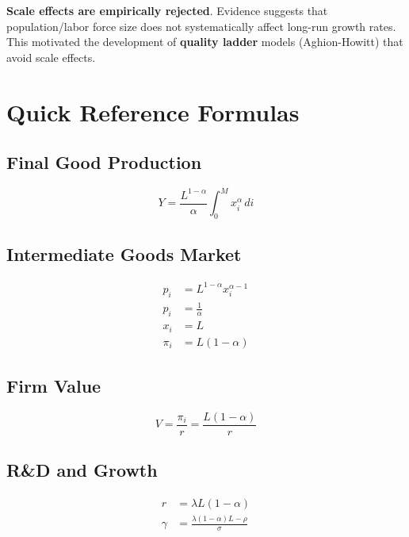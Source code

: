 \documentclass[a4paper,11pt]{article}
\begin{document}
\medskip
\begin{tcolorbox}[colback=yellow!10,colframe=yellow!60,title=Empirical Note]
\textbf{Scale effects are empirically rejected}. Evidence suggests that population/labor force size does not systematically affect long-run growth rates. This motivated the development of \textbf{quality ladder} models (Aghion-Howitt) that avoid scale effects.
\end{tcolorbox}

\clearpage

\section{Quick Reference Formulas}

\subsection*{Final Good Production}
\[
Y = \frac{L^{1-\alpha}}{\alpha} \int_0^M x_i^\alpha \, di
\tag{Final-Good}
\]

\subsection*{Intermediate Goods Market}
\begin{align*}
p_i &= L^{1-\alpha} x_i^{\alpha-1} \tag{Inverse Demand} \\
p_i &= \frac{1}{\alpha} \tag{Monopoly Price} \\
x_i &= L \tag{Optimal Output} \\
\pi_i &= L(1-\alpha) \tag{Monopoly Profits}
\end{align*}

\subsection*{Firm Value}
\[
V = \frac{\pi_i}{r} = \frac{L(1-\alpha)}{r}
\tag{Firm Value}
\]

\subsection*{R\&D and Growth}
\begin{align*}
r &= \lambda L (1-\alpha) \tag{Free Entry} \\
\gamma &= \frac{\lambda(1-\alpha)L - \rho}{\sigma} \tag{Romer Growth}
\end{align*}
\end{document}
